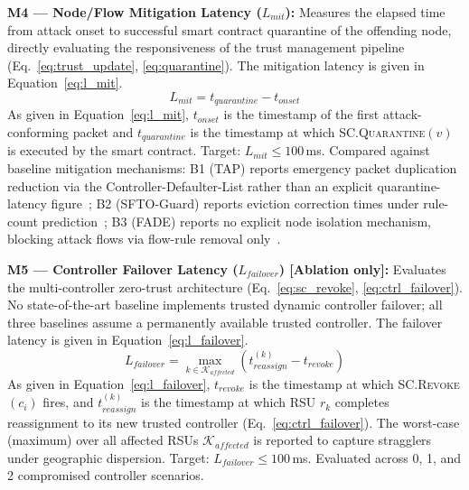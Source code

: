 \documentclass[12pt, a4paper]{report}
\begin{document}
{{%

\textbf{M4 — Node/Flow Mitigation Latency
($L_{mit}$):}
Measures the elapsed time from attack onset to
successful smart contract quarantine of the offending
node, directly evaluating the responsiveness of the
trust management pipeline
(Eq.~\ref{eq:trust_update}, \ref{eq:quarantine}).
The mitigation latency is given in
Equation~\eqref{eq:l_mit}.
\begin{equation}
L_{mit} = t_{quarantine} - t_{onset}
\label{eq:l_mit}
\end{equation}
As given in Equation~\eqref{eq:l_mit},
$t_{onset}$ is the timestamp of the first
attack-conforming packet and $t_{quarantine}$ is the
timestamp at which \textsc{SC.Quarantine}$(v)$ is
executed by the smart contract. Target: $L_{mit}
\leq 100$\,ms. Compared against baseline mitigation mechanisms:
B1 (TAP) reports emergency packet duplication
reduction via the Controller-Defaulter-List rather
than an explicit quarantine-latency
figure~\cite{Arsalan2018}; B2 (SFTO-Guard) reports
eviction correction times under rule-count
prediction~\cite{Tang2023SFTO}; B3 (FADE) reports no
explicit node isolation mechanism, blocking attack
flows via flow-rule removal
only~\cite{Zhang2021FADE}.



\textbf{M5 — Controller Failover Latency
($L_{failover}$) [Ablation only]:}
Evaluates the multi-controller zero-trust architecture
(Eq.~\ref{eq:sc_revoke}, \ref{eq:ctrl_failover}).
No state-of-the-art baseline implements trusted
dynamic controller failover; all three baselines assume
a permanently available trusted controller.
The failover latency is given in
Equation~\eqref{eq:l_failover}.
\begin{equation}
L_{failover} =
\underset{k \in \mathcal{K}_{affected}}{\max}
\left(
t_{reassign}^{(k)} - t_{revoke}
\right)
\label{eq:l_failover}
\end{equation}
As given in Equation~\eqref{eq:l_failover},
$t_{revoke}$ is the timestamp at which
\textsc{SC.Revoke}$(c_i)$ fires, and
$t_{reassign}^{(k)}$ is the timestamp at which
\ac{RSU} $r_k$ completes reassignment to its new
trusted controller (Eq.~\ref{eq:ctrl_failover}).
The worst-case (maximum) over all affected RSUs
$\mathcal{K}_{affected}$ is reported to capture
stragglers under geographic dispersion. Target:
$L_{failover} \leq 100$\,ms. Evaluated across
0, 1, and 2 compromised controller scenarios.


}}
\end{document}
